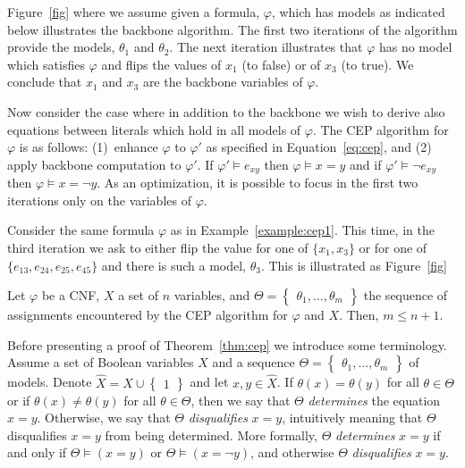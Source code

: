 \documentclass[runningheads,a4paper]{llncs}
\newcommand{\set}[1]{\left\{
      \begin{array}{l}\!\!#1\!\!\end{array}
      \right\}}
\begin{document}
\begin{example}\label{example:cep1}

  Figure~\ref{fig}\; where we assume given a
  formula, $\varphi$, which has models as indicated below illustrates
  the backbone algorithm.  The first two iterations of the algorithm
  provide the models, $\theta_1$ and $\theta_2$. The next iteration
  illustrates that $\varphi$ has no model which satisfies $\varphi$
  and flips the values of $x_1$ (to false) or of $x_3$ (to true). We
  conclude that $x_1$ and $x_3$ are the backbone variables of
  $\varphi$.

 \end{example}



Now consider the case where in addition to the backbone we wish to
derive also equations between literals which hold in all models of
$\varphi$. The CEP algorithm for $\varphi$ is as follows: (1)~enhance
$\varphi$ to $\varphi'$ as specified in Equation~\ref{eq:cep}, and (2)
apply backbone computation to $\varphi'$. 
If $\varphi'\models e_{xy}$ then $\varphi\models {x=y}$ and if
$\varphi'\models \neg e_{xy}$ then $\varphi\models {x= \neg y}$.
As an optimization, it is possible to focus in the first two
iterations only on the variables of $\varphi$.
\begin{example}\label{example:cep2}

  Consider the same formula $\varphi$ as in
  Example~\ref{example:cep1}.  This time, in the third iteration we
  ask to either flip the value for one of $\{x_1,x_3\}$ or for one of
  $\{e_{13},e_{24},e_{25},e_{45}\}$ and there is such a model, $\theta_3$. This is
  illustrated as Figure~\ref{fig}\;
\end{example}


\begin{theorem}\label{thm:cep}
  Let $\varphi$ be a CNF, $X$ a set of $n$ variables, and
  $\Theta=\set{\theta_1,\ldots,\theta_m}$ the sequence of assignments
  encountered by the CEP algorithm for $\varphi$ and $X$. Then, $m\leq
  n+1$.
\end{theorem}

Before presenting a proof of Theorem~\ref{thm:cep} we introduce some
terminology.
Assume a set of Boolean variables $X$ and a sequence
$\Theta=\set{\theta_1,\ldots,\theta_m}$ of models. Denote $\hat X=
X\cup\set{1}$ and let $x,y\in \hat X$.
If $\theta(x)=\theta(y)$ for all $\theta\in\Theta$ or if
$\theta(x)\neq\theta(y)$ for all $\theta\in\Theta$, then we say that
$\Theta$ \emph{determines} the equation $x=y$. Otherwise, we say that
$\Theta$ \emph{disqualifies} $x=y$, intuitively meaning that $\Theta$
disqualifies $x=y$ from being determined. More formally, $\Theta$
\emph{determines} $x=y$ if and only if $\Theta\models (x=y)$ or
$\Theta\models (x= \neg y)$, and otherwise $\Theta$
\emph{disqualifies} $x=y$.
\end{document}
